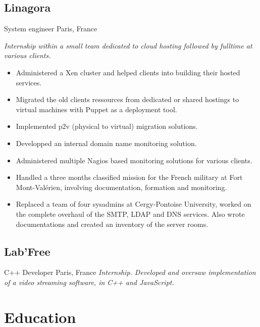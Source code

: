 \documentclass[]{friggeri-cv} %
\begin{document}
\subsection{Linagora}
\begin{entrylist}
 {System engineer} {Paris, France} {
  \emph{Internship within a small team dedicated to cloud hosting followed by fulltime at various clients.}
  \begin{itemize}
    \item Administered a Xen cluster and helped clients into building their hosted services.
    \item Migrated the old clients ressources from dedicated or shared hostings to virtual machines with Puppet as a deployment tool.
    \item Implemented p2v (physical to virtual) migration solutions.
    \item Developped an internal domain name monitoring solution.
    \item Administered multiple Nagios based monitoring solutions for various clients.
    \item Handled a three months classified mission for the French military at Fort Mont-Valérien, involving documentation, formation and monitoring.
    \item Replaced a team of four sysadmins at Cergy-Pontoise University, worked on the complete overhaul of the SMTP, LDAP and DNS services. Also wrote documentations and created an inventory of the server rooms.
  \end{itemize}
}
\end{entrylist}


\subsection{Lab'Free}
\begin{entrylist}
 {C++ Developer} {Paris, France} {
  \emph{Internship. Developed and oversaw implementation of a video streaming software, in C++ and JavaScript.}
}
\end{entrylist}


\section{Education}
\end{document}
